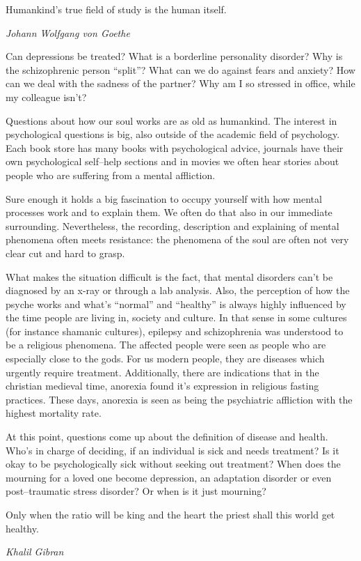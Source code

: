 \documentclass[../main.tex]{subfiles}
\begin{document}
\epigraph{Humankind's true field of study is the human itself.}{\textit{Johann Wolfgang von Goethe}}

Can depressions be treated?
What is a borderline personality disorder?
Why is the schizophrenic person ``split''?
What can we do against fears and anxiety?
How can we deal with the sadness of the partner?
Why am I so stressed in office, while my colleague isn't?

Questions about how our soul works are as old as humankind.
The interest in psychological questions is big, also outside of the academic field of psychology.
Each book store has many books with psychological advice, journals have their own psychological self--help sections
and in movies we often hear stories about people who are suffering from a mental affliction.

Sure enough it holds a big fascination to occupy yourself with how mental processes work and to explain them.
We often do that also in our immediate surrounding.
Nevertheless, the recording, description and explaining of mental phenomena often meets resistance:
the phenomena of the soul are often not very clear cut and hard to grasp.

What makes the situation difficult is the fact, that mental disorders
can't be diagnosed by an x-ray or through a lab analysis.
Also, the perception of how the psyche works and what's ``normal'' and ``healthy''
is always highly influenced by the time people are living in, society and culture.
In that sense in some cultures (for instance shamanic cultures),
epilepsy and schizophrenia was understood to be a religious phenomena.
The affected people were seen as people who are especially close to the gods.
For us modern people, they are diseases which urgently require treatment.
Additionally, there are indications that in the christian medieval time,
anorexia found it's expression in religious fasting practices.
These days, anorexia is seen as being the psychiatric affliction with the highest mortality rate.

At this point, questions come up about the definition of disease and health.
Who's in charge of deciding, if an individual is sick and needs treatment?
Is it okay to be psychologically sick without seeking out treatment?
When does the mourning for a loved one become depression, an adaptation disorder or even
post--traumatic stress disorder?
Or when is it just mourning?

\epigraph{Only when the ratio will be king and the heart the priest shall this world get healthy.}{\textit{Khalil Gibran}}
\end{document}
